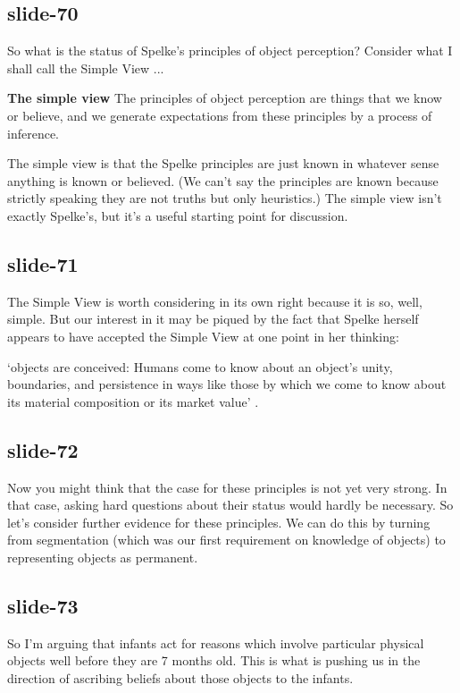 \documentclass[12pt,\papersize]{extarticle}
\begin{document}
\subsection{slide-70}
So what is the status of Spelke’s principles of object perception?
Consider what I shall call the Simple View ...
 
\textbf{The simple view}
The principles of object perception are things that we know or believe, 
and we generate expectations from these principles by a process of inference.
 
The simple view is that the Spelke principles are just known in whatever sense anything is 
known or believed.
(We can't say the principles are known because strictly speaking they are not truths but only
heuristics.)
The simple view isn’t exactly Spelke’s, but it’s a useful starting point for discussion.
 
\subsection{slide-71}
The Simple View is worth considering in its own right because it is so, well, simple.
But our interest in it may be piqued by the fact that   
Spelke herself appears to have accepted the Simple View at one point in her thinking:
 
‘objects are conceived: Humans come to know about an object’s unity, boundaries, and 
persistence in ways like those by which we come to know about its material composition or its 
market value’
\citep[p.\ 198]{Spelke:1988xc}.
 
\subsection{slide-72}
Now you might think that the case for these principles is not yet very strong.
In that case, asking hard questions about their status would hardly be necessary.
So let’s consider further evidence for these principles.
We can do this by turning from segmentation (which was our first requirement on knowledge of 
objects) 
to representing objects as permanent.
 
\subsection{slide-73}
So I’m arguing that infants act for reasons which involve particular physical 
objects well before they are 7 months old.
This is what is pushing us in the direction of ascribing beliefs about
those objects to the infants.
 
\end{document}
